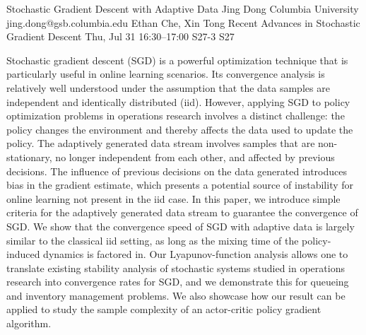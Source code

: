 \begin{talk}
  {Stochastic Gradient Descent with Adaptive Data}%
  {Jing Dong}%
  {Columbia University}%
  {jing.dong@gsb.columbia.edu}%
  {Ethan Che, Xin Tong}%
  {Recent Advances in Stochastic Gradient Descent}%
  {Thu, Jul 31 16:30--17:00}%
  {S27-3}%
  {S27}%
    
                
Stochastic gradient descent (SGD) is a powerful optimization technique that is particularly useful in online learning scenarios. Its convergence analysis is relatively well understood under the assumption that the data samples are independent and identically distributed (iid). However, applying SGD to policy optimization
problems in operations research involves a distinct challenge: the policy changes the environment and thereby affects the data used to update the policy. The adaptively generated data stream involves samples that are non-stationary, no longer independent from each other, and affected by previous decisions. The influence of previous decisions on the data generated introduces bias in the gradient estimate, which presents a potential source of instability for online learning not present in the iid case. In this paper, we introduce simple criteria for the adaptively generated data stream to guarantee the convergence of SGD. We show that the convergence
speed of SGD with adaptive data is largely similar to the classical iid setting, as long as the mixing time of the policy-induced dynamics is factored in. Our Lyapunov-function analysis allows one to translate existing stability analysis of stochastic systems studied in operations research into convergence rates for SGD, and
we demonstrate this for queueing and inventory management problems. We also showcase how our result can be applied to study the sample complexity of an actor-critic policy gradient algorithm.   


\medskip


\end{talk}

